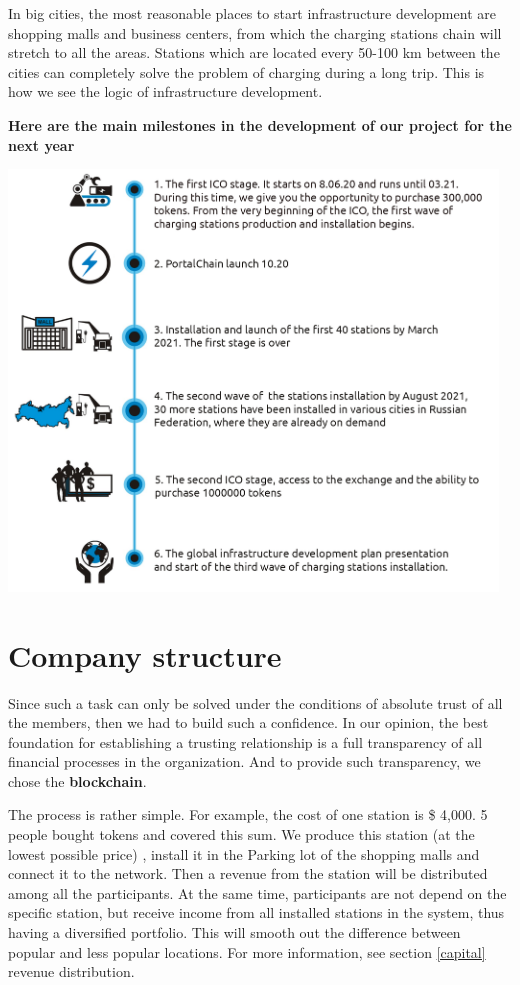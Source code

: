 \documentclass[a4paper,12pt]{report}
\begin{document}
In big cities, the most reasonable places to start infrastructure development are shopping  malls and business centers, from which the  charging stations  chain will stretch to all  the areas.
Stations which are  located every 50-100 km between the cities  can completely solve the problem of charging  during a long trip.
This is how we see the logic of infrastructure development.

\begin{center}
	\textbf{Here are the main milestones in the development of our project for the next year}
\end{center}

\includegraphics[width=13cm]{roadmapen}
\vspace*{1cm}

\chapter{Company structure}

Since such a task can only be solved under the conditions of absolute trust  of all the members, then we had to build such a confidence. In our opinion, the best foundation for establishing a  trusting relationship is a full transparency of all financial processes in the organization. And to provide  such transparency, we chose the \textbf{blockchain}.

The process  is rather simple. For example, the cost of one station is \$ 4,000. 5 people bought tokens and covered this sum.
We produce this station  (at the lowest possible price) , install  it  in the Parking lot of the shopping malls and connect it to the network. Then a revenue from the station will be distributed among all the participants. At the same time, participants are not depend on the specific station, but receive income from all installed stations in the system, thus having a diversified portfolio. This will smooth out the difference between popular and less popular locations. For more information, see section \ref{capital} revenue distribution.
\end{document}

